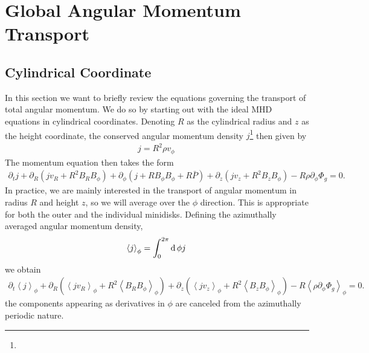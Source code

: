 \documentclass{article}
\newcommand{\hyw}[1]{{\color{red}{[{#1}]}}}
\begin{document}
\section{Global Angular Momentum Transport}
\label{app:amt}

\subsection{Cylindrical Coordinate}

In this section we want to briefly review the equations governing the transport of total angular momentum. We do so by starting out with the ideal MHD equations in cylindrical coordinates. Denoting %
$R$ as the cylindrical radius and $z$ as the height coordinate, the conserved angular momentum density $j$\footnote{\hyw{The specific angular momentum is $l=R v_\phi$. To have the conserved angular momentum in the radial direction, one need to do the integration along both azimuthal and vertical directions $\int R d\phi \int dz \rho l=\int d\phi \int dz (R^2 \rho v_\phi)$. So the conserved angular momentum current across different cylinders (having $R$ constant) has the form of $j=R^2 \rho v_\phi$}} then given by
\begin{align}
    j = R^2 \rho v_\phi\,
\end{align}
The momentum equation then takes the form
\begin{align}
    \partial_t j + \partial_R \left( j v_R + R^2 B_R B_\phi \right) + \partial_\phi \left( {j} + R B_\phi B_\phi + R \bar{P}\right) + \partial_z \left(j v_z  + R^2 B_z B_\phi\right) - R \rho \partial_\phi \Phi_g = 0.
\end{align}
In practice, we are mainly interested in the transport of angular momentum in radius $R$ and height $z$, so we will average over the $\phi$ direction. This is appropriate for both the outer and the individual minidisks.
Defining the azimuthally averaged angular momentum density,
\begin{align}
    \left<j\right>_\phi = \int_0^{2\pi}{\rm d}\, \phi j\,
\end{align}
we obtain
\begin{align}
\partial_t \left<j\right>_\phi + \partial_R \left( \left<j v_R \right>_\phi + R^2 \left<B_R B_\phi\right>_\phi \right) + \partial_z \left(\left< j v_z \right>_\phi + R^2 \left<B_z B_\phi \right>_\phi \right) - R \left<\rho \partial_\phi \Phi_g\right>_\phi = 0.
\end{align}
the components appearing as derivatives in $\phi$ are canceled from the azimuthally periodic nature.
\end{document}
